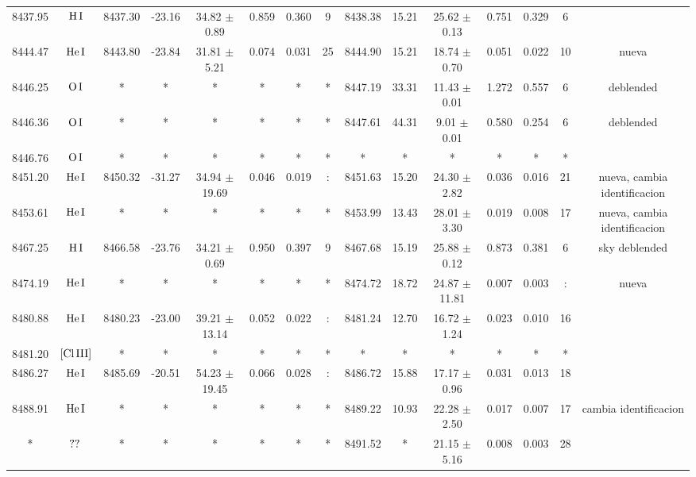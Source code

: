 \documentclass{article}
\begin{document}
\begin{table*}
\begin{adjustbox}{width=\textwidth}
\begin{tabular}{ccccccccccccccc}
8437.95 & $\mbox{H}\thinspace \mbox{I}$ & 8437.30 & -23.16 & 34.82 $\pm$ 0.89 & 0.859 & 0.360 & 9 & 8438.38 & 15.21 & 25.62 $\pm$ 0.13 & 0.751 & 0.329 & 6 &  \\
8444.47 & $\mbox{He}\thinspace \mbox{I}$ & 8443.80 & -23.84 & 31.81 $\pm$ 5.21 & 0.074 & 0.031 & 25 & 8444.90 & 15.21 & 18.74 $\pm$ 0.70 & 0.051 & 0.022 & 10 &  nueva \\
8446.25 & $\mbox{O}\thinspace \mbox{I}$ & * & * & * & * & * & * & 8447.19 & 33.31 & 11.43 $\pm$ 0.01 & 1.272 & 0.557 & 6 &  deblended \\
8446.36 & $\mbox{O}\thinspace \mbox{I}$ & * & * & * & * & * & * & 8447.61 & 44.31 & 9.01 $\pm$ 0.01 & 0.580 & 0.254 & 6 &  deblended \\
8446.76 & $\mbox{O}\thinspace \mbox{I}$ & * & * & * & * & * & * & * & * & * & * & * & * &  \\
8451.20 & $\mbox{He}\thinspace \mbox{I}$ & 8450.32 & -31.27 & 34.94 $\pm$ 19.69 & 0.046 & 0.019 & : & 8451.63 & 15.20 & 24.30 $\pm$ 2.82 & 0.036 & 0.016 & 21 &  nueva, cambia identificacion \\
8453.61 & $\mbox{He}\thinspace \mbox{I}$ & * & * & * & * & * & * & 8453.99 & 13.43 & 28.01 $\pm$ 3.30 & 0.019 & 0.008 & 17 &  nueva, cambia identificacion \\
8467.25 & $\mbox{H}\thinspace \mbox{I}$ & 8466.58 & -23.76 & 34.21 $\pm$ 0.69 & 0.950 & 0.397 & 9 & 8467.68 & 15.19 & 25.88 $\pm$ 0.12 & 0.873 & 0.381 & 6 &  sky deblended \\
8474.19 & $\mbox{He}\thinspace \mbox{I}$ & * & * & * & * & * & * & 8474.72 & 18.72 & 24.87 $\pm$ 11.81 & 0.007 & 0.003 & : &  nueva \\
8480.88 & $\mbox{He}\thinspace \mbox{I}$ & 8480.23 & -23.00 & 39.21 $\pm$ 13.14 & 0.052 & 0.022 & : & 8481.24 & 12.70 & 16.72 $\pm$ 1.24 & 0.023 & 0.010 & 16 &  \\
8481.20 & $\mbox{[Cl}\thinspace \mbox{III]}$ & * & * & * & * & * & * & * & * & * & * & * & * &  \\
8486.27 & $\mbox{He}\thinspace \mbox{I}$ & 8485.69 & -20.51 & 54.23 $\pm$ 19.45 & 0.066 & 0.028 & : & 8486.72 & 15.88 & 17.17 $\pm$ 0.96 & 0.031 & 0.013 & 18 &  \\
8488.91 & $\mbox{He}\thinspace \mbox{I}$ & * & * & * & * & * & * & 8489.22 & 10.93 & 22.28 $\pm$ 2.50 & 0.017 & 0.007 & 17 &  cambia identificacion \\
* & $\mbox{??}\thinspace \mbox{}$ & * & * & * & * & * & * & 8491.52 & * & 21.15 $\pm$ 5.16 & 0.008 & 0.003 & 28 &  \\

\end{tabular}
\end{adjustbox}
\end{table*}
\end{document}
